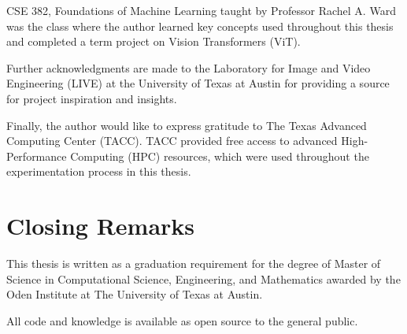 CSE 382, Foundations of Machine Learning taught by Professor Rachel A. Ward 
was the class where the author learned key concepts used throughout this thesis
and completed a term project on Vision Transformers (ViT).


Further acknowledgments are made to the Laboratory for Image and Video Engineering (LIVE) at the 
University of Texas at Austin for providing a source for project inspiration and insights.


Finally, the author would like to express gratitude to The Texas Advanced Computing Center (TACC).
TACC provided free access to advanced High-Performance Computing (HPC) resources,
which were used throughout the experimentation process in this thesis.

\section{Closing Remarks}

This thesis is written as a graduation requirement for the degree of Master of Science 
in Computational Science, Engineering, and Mathematics awarded by the Oden Institute at 
The University of Texas at Austin.


All code and knowledge is available as open source to the general public.